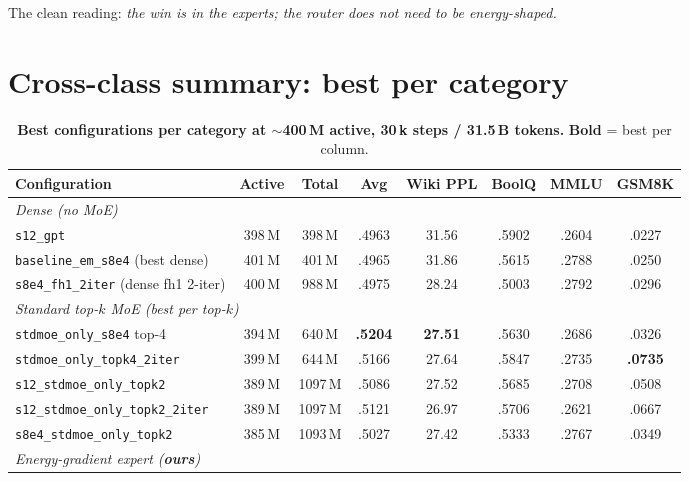 \documentclass[oneside]{article}
\begin{document}
The clean reading: \emph{the win is in the experts; the router does
not need to be energy-shaped.}


\section{Cross-class summary: best per category}
\label{sec:summary}

\begin{table}[t]
\centering
\caption{\textbf{Best configurations per category at $\sim$400\,M
active, 30\,k steps / 31.5\,B tokens.} \textbf{Bold} = best per
column.}
\label{tab:summary}
\begin{adjustbox}{max width=\textwidth}
\begin{tabular}{l|cc|c|c|c|c|c}
\toprule
\textbf{Configuration} & \textbf{Active} & \textbf{Total} & \textbf{Avg} & \textbf{Wiki PPL} & \textbf{BoolQ} & \textbf{MMLU} & \textbf{GSM8K} \\
\midrule
\multicolumn{8}{l}{\emph{Dense (no MoE)}} \\
\texttt{s12\_gpt}                          & 398\,M & 398\,M & .4963 & 31.56 & .5902 & .2604 & .0227 \\
\texttt{baseline\_em\_s8e4} (best dense)   & 401\,M & 401\,M & .4965 & 31.86 & .5615 & .2788 & .0250 \\
\texttt{s8e4\_fh1\_2iter} (dense fh1 2-iter) & 400\,M & 988\,M & .4975 & 28.24 & .5003 & .2792 & .0296 \\
\midrule
\multicolumn{8}{l}{\emph{Standard top-$k$ MoE (best per top-$k$)}} \\
\texttt{stdmoe\_only\_s8e4} top-4          & 394\,M & 640\,M  & \textbf{.5204} & \textbf{27.51} & .5630 & .2686 & .0326 \\
\texttt{stdmoe\_only\_topk4\_2iter}        & 399\,M & 644\,M  & .5166 & 27.64 & .5847 & .2735 & \textbf{.0735} \\
\texttt{s12\_stdmoe\_only\_topk2}          & 389\,M & 1097\,M & .5086 & 27.52 & .5685 & .2708 & .0508 \\
\texttt{s12\_stdmoe\_only\_topk2\_2iter}   & 389\,M & 1097\,M & .5121 & 26.97 & .5706 & .2621 & .0667 \\
\texttt{s8e4\_stdmoe\_only\_topk2}         & 385\,M & 1093\,M & .5027 & 27.42 & .5333 & .2767 & .0349 \\
\midrule
\multicolumn{8}{l}{\emph{Energy-gradient expert (\textbf{ours})}} \\

\end{tabular}
\end{adjustbox}
\end{table}
\end{document}
